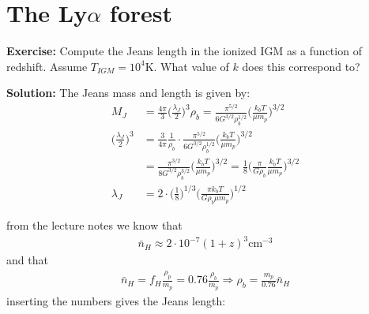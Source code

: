 \documentclass[paper=a4, fontsize=11pt]{scrartcl} %
\numberwithin{figure}{section} %
\numberwithin{table}{section} %
\begin{document}

\section{The Ly$\alpha$ forest}

\textbf{Exercise:} Compute the Jeans length in the ionized IGM as a function of redshift. Assume $T_{IGM} = 10^4$K. What value of $k$ does this correspond to?

\textbf{Solution:} The Jeans mass and length is given by:
\begin{align*}
M_J &= \frac{4\pi}{3} \Bigg( \frac{\lambda_J}{2} \Bigg)^3 \rho_b = \frac{\pi^{5/2}}{6G^{3/2}\rho_b^{1/2}} \Bigg( \frac{k_bT}{\mu m_p} \Bigg)^{3/2} \\
\Bigg( \frac{\lambda_J}{2} \Bigg)^3 &= \frac{3}{4\pi}\frac{1}{\rho_b} \cdot \frac{\pi^{5/2}}{6G^{3/2}\rho_b^{1/2}} \Bigg( \frac{k_bT}{\mu m_p} \Bigg)^{3/2} \\
&= \frac{\pi^{3/2}}{8G^{3/2}\rho_b^{3/2}} \Bigg( \frac{k_bT}{\mu m_p} \Bigg)^{3/2} = \frac{1}{8} \Bigg(\frac{\pi}{G\rho_b}  \frac{k_bT}{\mu m_p} \Bigg)^{3/2}  \\
\lambda_J &= 2\cdot \Bigg( \frac{1}{8} \Bigg)^{1/3} \Bigg( \frac{\pi k_bT}{G\rho_b\mu m_p} \Bigg)^{1/2}
\end{align*}

from the lecture notes we know that
\begin{align*}
\bar{n}_H \approx 2 \cdot 10^{-7} (1 + z)^3 \mathrm{cm}^{-3}
\end{align*}
and that
\begin{align*}
\bar{n}_H  = f_H\frac{\rho_p}{m_p} = 0.76 \frac{\rho_b}{m_p} \Rightarrow \rho_b = \frac{m_p}{0.76}\bar{n}_H 
\end{align*}
inserting the numbers gives the Jeans length:










\end{document}
